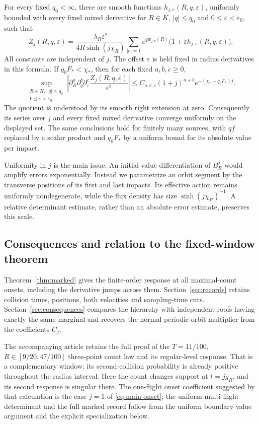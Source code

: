 \begin{theorem}\label{thm:marked}
For every fixed $q_0<\infty$, there are smooth functions
$h_{j,e}(R,q,\varepsilon)$, uniformly bounded with every fixed mixed
derivative for $R\in K$, $|q|\le q_0$ and
$0\le\varepsilon<\varepsilon_0$, such that
\begin{equation}\label{eq:marked-onset}
 Z_j(R,q,\varepsilon)=
 \frac{\lambda_R\varepsilon^2}{4R\sinh(j\chi_R)}
 \sum_{|e|=1} e^{q w_{j,e}(R)}
           \bigl(1+\varepsilon h_{j,e}(R,q,\varepsilon)\bigr).
\end{equation}
All constants are independent of $j$. The offset $\varepsilon$ is held
fixed in radius derivatives in this formula. If $q_0F_*<\chi_*$, then
for each fixed $a,b,c\ge0$,
\begin{equation}\label{eq:summable}
 \sup_{\substack{R\in K,\ |q|\le q_0\\0\le\varepsilon<\varepsilon_0}}
 \left|\partial_R^a\partial_q^b\partial_\varepsilon^c
       \frac{Z_j(R,q,\varepsilon)}{\varepsilon^2}\right|
 \le C_{a,b,c}(1+j)^{a+b}
           e^{-(\chi_*-q_0F_*)j}.
\end{equation}
The quotient is understood by its smooth right extension at zero.
Consequently its series over $j$ and every fixed mixed derivative
converge uniformly on the displayed set. The same conclusions hold
for finitely many sources, with $qf$ replaced by a scalar product and
$q_0F_*$ by a uniform bound for its absolute value per impact.
\end{theorem}

Uniformity in $j$ is the main issue. An initial-value differentiation
of $B_R^j$ would amplify errors exponentially. Instead we parametrize
an orbit segment by the transverse positions of its first and last
impacts. Its effective action remains uniformly nondegenerate, while
the flux density has size $\sinh(j\chi_R)^{-1}$. A relative determinant
estimate, rather than an absolute error estimate, preserves this scale.

\subsection{Consequences and relation to the fixed-window theorem}
Theorem~\ref{thm:marked} gives the finite-order response at all maximal-count
onsets, including the derivative jumps across them. Section~\ref{sec:records}
retains collision times, positions, both velocities and sampling-time cuts.
Section~\ref{sec:consequences} compares the hierarchy with independent roofs
having exactly the same marginal and recovers the normal periodic-orbit
multiplier from the coefficients $C_j$.

The accompanying article \cite{TC} retains the full proof of the
$T=11/100$, $R\in[9/20,47/100]$ three-point count law and its regular-level
response. That is a complementary window: its second-collision probability
is already positive throughout the radius interval. Here the count changes
support at $t=jg_R$, and its second response is singular there. The
one-flight onset coefficient suggested by that calculation is the case
$j=1$ of \eqref{eq:main-onset}; the uniform multi-flight determinant and
the full marked record follow from the uniform boundary-value argument
and the explicit specialization below.
